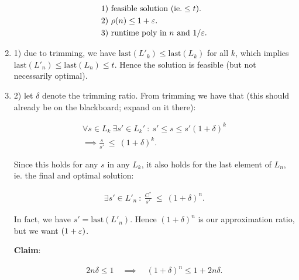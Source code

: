 \begin{enumerate}
    \begin{textred}
      \begin{align*}
        &\text{1) feasible solution }(\text{ie.} \leq t).\\
        &\text{2) }\rho(n) \leq 1 + \varepsilon.\\
        &\text{3) runtime poly in } n \text{ and } 1/\varepsilon.
      \end{align*}
    \end{textred}

  \item 1) due to trimming, we have $\text{last}(L'_k) \leq \text{last}(L_k)$ for all $k$,
    which implies $\text{last}(L'_n) \leq \text{last}(L_n) \leq t$. Hence the solution is
    feasible (but not necessarily optimal).

  \item 2) let $\delta$ denote the trimming ratio. From trimming we have that
    (this should already be on the blackboard; expand on it there):

    \begin{textred}
      \begin{align}
        \forall s \in L_k\  \exists s' \in L_k'\ :\ s' \leq s \leq s' (1 +
        \delta)^k\\
        \implies \frac{s}{s'}\ \leq\ (1 + \delta)^k.
      \end{align}
    \end{textred}

    Since this holds for any $s$ in any $L_k$, it also holds for the last
    element of $L_n$, ie. the final and optimal solution:

    \begin{textred}
      \begin{align}
        \exists s' \in L'_n\ :\ \frac{C^\ast}{s'}\ \leq\ (1 + \delta)^n.
      \end{align}
    \end{textred}

    In fact, we have $s' = \text{last}(L'_n)$. Hence $(1 + \delta)^n$ is our
    approximation ratio, but we want $(1 + \varepsilon)$.

    \medskip

    \textbf{Claim}:

    \begin{textred}
      \begin{align}
        2n\delta \leq 1 \quad\implies\quad (1 + \delta)^n \leq 1 + 2n\delta. 
      \end{align}
    \end{textred}


\end{enumerate}
